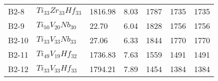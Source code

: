\begin{tabular}{lllllll}
         B2-8 &                                $Ti_{33}Zr_{33}Hf_{33}$ &              1816.98 &                           8.03 &                              1787 &                             1735 &                                         1735 \\
         B2-9 &                                 $Ti_{50}V_{20}Nb_{30}$ &                22.70 &                           6.04 &                              1828 &                             1756 &                                         1756 \\
        B2-10 &                                 $Ti_{33}V_{33}Nb_{33}$ &                27.06 &                           6.33 &                              1844 &                             1770 &                                         1770 \\
        B2-11 &                                 $Ti_{49}V_{19}Hf_{32}$ &              1736.83 &                           7.63 &                              1559 &                             1491 &                                         1491 \\
        B2-12 &                                 $Ti_{33}V_{33}Hf_{33}$ &              1794.21 &                           7.89 &                              1454 &                             1384 &                                         1384 \\
\bottomrule
\end{tabular}
